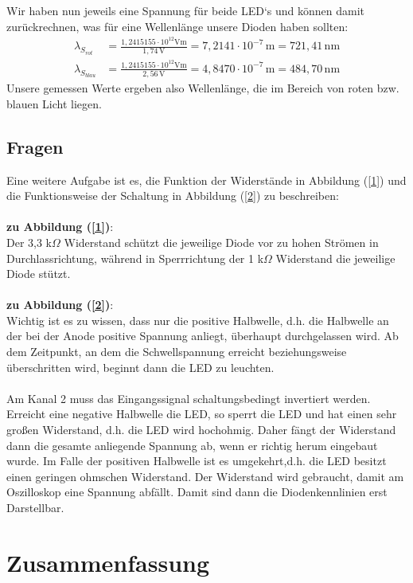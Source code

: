 \documentclass[fontsize=12pt]{scrartcl}
\begin{document}
Wir haben nun jeweils eine Spannung für beide LED`s und können damit zurückrechnen, was für eine Wellenlänge unsere Dioden haben sollten:\\
\begin{align*}
\lambda_{S_{rot}}&=\frac{1,2415155\cdot 10^{12}\text{Vm}}{1,74\,\text{V}}=7,2141\cdot10^{-7}\,\text{m}=721,41\,\text{nm}\\
\lambda_{S_{blau}}&=\frac{1,2415155\cdot 10^{12}\text{Vm}}{2,56\,\text{V}}=4,8470\cdot10^{-7}\,\text{m}=484,70\,\text{nm}
\end{align*}
Unsere gemessen Werte ergeben also Wellenlänge, die im Bereich von roten bzw. blauen Licht liegen.

\subsection{Fragen}

Eine weitere Aufgabe ist es, die Funktion der Widerstände in Abbildung (\ref{1}) und die Funktionsweise der Schaltung in Abbildung (\ref{2}) zu beschreiben:\\
~\\
\textbf{zu Abbildung (\ref{1})}:\\
Der 3,3 k$\Omega$ Widerstand schützt die jeweilige Diode vor zu hohen Strömen in Durchlassrichtung, während in Sperrrichtung der 1 k$\Omega$ Widerstand die jeweilige Diode stützt.\\
~\\
\textbf{zu Abbildung (\ref{2})}:\\
Wichtig ist es zu wissen, dass nur die positive Halbwelle, d.h. die Halbwelle an der bei der Anode positive Spannung anliegt, überhaupt durchgelassen wird. Ab dem Zeitpunkt, an dem die Schwellspannung erreicht beziehungsweise überschritten wird, beginnt dann die LED zu leuchten.  \\
~\\
Am Kanal 2 muss das Eingangssignal schaltungsbedingt invertiert werden. Erreicht eine negative Halbwelle die LED, so sperrt die LED und hat einen sehr großen Widerstand, d.h. die LED wird hochohmig. Daher fängt der Widerstand dann die gesamte anliegende Spannung ab, wenn er richtig herum eingebaut wurde. Im Falle der positiven Halbwelle ist es umgekehrt,d.h. die LED besitzt einen geringen ohmschen Widerstand.
Der Widerstand wird gebraucht, damit am Oszilloskop eine Spannung abfällt. Damit sind dann die Diodenkennlinien erst Darstellbar.  
\newpage

\section{Zusammenfassung}
\end{document}

